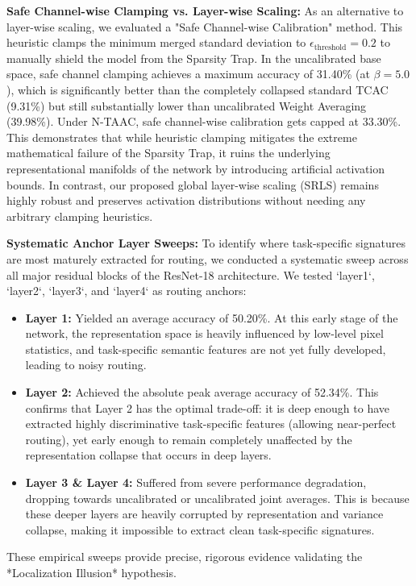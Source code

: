 \documentclass{article}
\theoremstyle{plain}
\theoremstyle{definition}
\theoremstyle{remark}
\begin{document}
\textbf{Safe Channel-wise Clamping vs. Layer-wise Scaling:}
As an alternative to layer-wise scaling, we evaluated a "Safe Channel-wise Calibration" method. This heuristic clamps the minimum merged standard deviation to $\epsilon_{\text{threshold}} = 0.2$ to manually shield the model from the Sparsity Trap. In the uncalibrated base space, safe channel clamping achieves a maximum accuracy of 31.40\% (at $\beta=5.0$), which is significantly better than the completely collapsed standard TCAC (9.31\%) but still substantially lower than uncalibrated Weight Averaging (39.98\%). Under N-TAAC, safe channel-wise calibration gets capped at 33.30\%. This demonstrates that while heuristic clamping mitigates the extreme mathematical failure of the Sparsity Trap, it ruins the underlying representational manifolds of the network by introducing artificial activation bounds. In contrast, our proposed global layer-wise scaling (SRLS) remains highly robust and preserves activation distributions without needing any arbitrary clamping heuristics.

\textbf{Systematic Anchor Layer Sweeps:}
To identify where task-specific signatures are most maturely extracted for routing, we conducted a systematic sweep across all major residual blocks of the ResNet-18 architecture. We tested `layer1`, `layer2`, `layer3`, and `layer4` as routing anchors:
\begin{itemize}
  \item \textbf{Layer 1:} Yielded an average accuracy of 50.20\%. At this early stage of the network, the representation space is heavily influenced by low-level pixel statistics, and task-specific semantic features are not yet fully developed, leading to noisy routing.
  \item \textbf{Layer 2:} Achieved the absolute peak average accuracy of 52.34\%. This confirms that Layer 2 has the optimal trade-off: it is deep enough to have extracted highly discriminative task-specific features (allowing near-perfect routing), yet early enough to remain completely unaffected by the representation collapse that occurs in deep layers.
  \item \textbf{Layer 3 \& Layer 4:} Suffered from severe performance degradation, dropping towards uncalibrated or uncalibrated joint averages. This is because these deeper layers are heavily corrupted by representation and variance collapse, making it impossible to extract clean task-specific signatures.
\end{itemize}
These empirical sweeps provide precise, rigorous evidence validating the *Localization Illusion* hypothesis.
\end{document}
